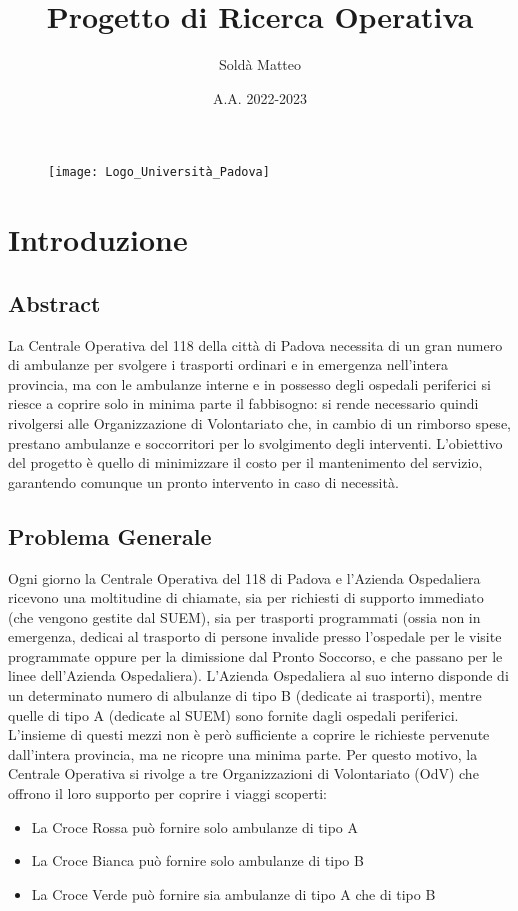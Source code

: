 \documentclass[12pt, a4paper]{article}
\title{Progetto di Ricerca Operativa}
\author{Soldà Matteo }
\date{A.A. 2022-2023}
\begin{document}
\begin{figure}
    \centering
    \texttt{[image: Logo\_Università\_Padova]}
\end{figure}

\maketitle

\newpage
\tableofcontents

\newpage
\section{Introduzione}
\subsection{Abstract}
La Centrale Operativa del 118 della città di Padova necessita di un gran numero di ambulanze per svolgere i trasporti ordinari e in emergenza nell’intera provincia, ma con le ambulanze interne e in possesso degli ospedali periferici si riesce a coprire solo in minima parte il fabbisogno: si rende necessario quindi rivolgersi alle Organizzazione di Volontariato che, in cambio di un rimborso spese, prestano ambulanze e soccorritori per lo svolgimento degli interventi. 
L’obiettivo del progetto è quello di minimizzare il costo per il mantenimento del servizio, garantendo comunque un pronto intervento in caso di necessità. 

\subsection{Problema Generale}
Ogni giorno la Centrale Operativa del 118 di Padova e l'Azienda Ospedaliera ricevono una moltitudine di chiamate, sia per richiesti di supporto immediato (che vengono gestite dal SUEM), sia per trasporti programmati (ossia non in emergenza, dedicai al trasporto di persone invalide presso l'ospedale per le visite programmate oppure per la dimissione dal Pronto Soccorso, e che passano per le linee dell'Azienda Ospedaliera).
\newline \newline
L'Azienda Ospedaliera al suo interno disponde di un determinato numero di albulanze di tipo B (dedicate ai trasporti), mentre quelle di tipo A (dedicate al SUEM) sono fornite dagli ospedali periferici. L'insieme di questi mezzi non è però sufficiente a coprire le richieste pervenute dall'intera provincia, ma ne ricopre una minima parte. Per questo motivo, la Centrale Operativa si rivolge a tre Organizzazioni di Volontariato (OdV) che offrono il loro supporto per coprire i viaggi scoperti:
\begin{itemize}
    \item La Croce Rossa può fornire solo ambulanze di tipo A
    \item La Croce Bianca può fornire solo ambulanze di tipo B
    \item La Croce Verde può fornire sia ambulanze di tipo A che di tipo B
\end{itemize}
\end{document}
